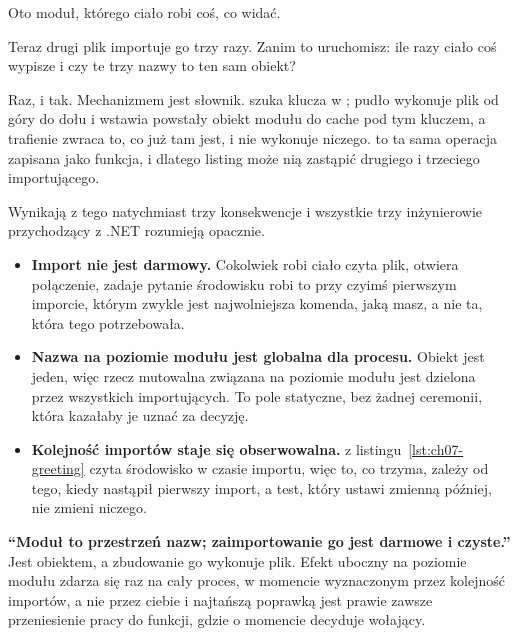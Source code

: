 Oto moduł, którego ciało robi coś, co widać.


\noindent
Teraz drugi plik importuje go trzy razy. Zanim to uruchomisz: ile razy ciało
coś wypisze i czy te trzy nazwy to ten sam obiekt?



\noindent
Raz, i tak. Mechanizmem jest słownik.  szuka klucza
 w ; pudło wykonuje plik od góry do dołu i wstawia
powstały obiekt modułu do cache pod tym kluczem, a trafienie zwraca to, co
już tam jest, i nie wykonuje niczego.  to ta
sama operacja zapisana jako funkcja, i dlatego listing może nią zastąpić
drugiego i trzeciego importującego.


\noindent
Wynikają z tego natychmiast trzy konsekwencje i wszystkie trzy inżynierowie
przychodzący z .NET rozumieją opacznie.

\begin{itemize}[leftmargin=1.4em, itemsep=3pt]
  \item \textbf{Import nie jest darmowy.} Cokolwiek robi ciało \dash{}
        czyta plik, otwiera połączenie, zadaje pytanie środowisku \dash{}
        robi to przy czyimś pierwszym imporcie, którym zwykle jest
        najwolniejsza komenda, jaką masz, a nie ta, która tego
        potrzebowała.
  \item \textbf{Nazwa na poziomie modułu jest globalna dla procesu.} Obiekt
        jest jeden, więc rzecz mutowalna związana na poziomie modułu jest
        dzielona przez wszystkich importujących. To pole statyczne, bez
        żadnej ceremonii, która kazałaby je uznać za decyzję.
  \item \textbf{Kolejność importów staje się obserwowalna.}
         z listingu~\ref{lst:ch07-greeting} czyta
        środowisko w czasie importu, więc to, co trzyma, zależy od tego,
        kiedy nastąpił pierwszy import, a test, który ustawi zmienną
        później, nie zmieni niczego.
\end{itemize}

\begin{trapbox}
\textbf{\enquote{Moduł to przestrzeń nazw; zaimportowanie go jest darmowe i
czyste.}} Jest obiektem, a zbudowanie go wykonuje plik. Efekt uboczny na
poziomie modułu zdarza się raz na cały proces, w momencie wyznaczonym przez
kolejność importów, a nie przez ciebie \dash{} i najtańszą poprawką jest
prawie zawsze przeniesienie pracy do funkcji, gdzie o momencie decyduje
wołający.
\end{trapbox}

